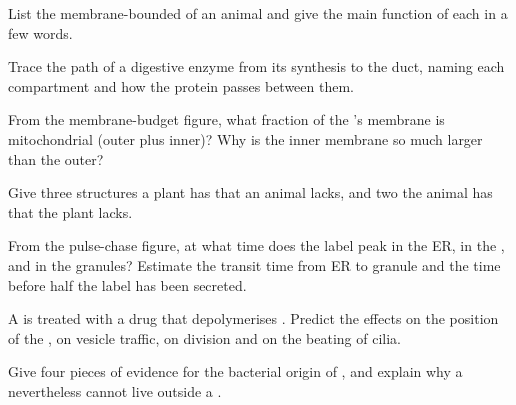 \begin{exercise}[$\star$]\label{exo:b1:eukaryotic-cell:1}
List the membrane-bounded  of an animal  and give the
main function of each in a few words.
\end{exercise}

\begin{exercise}[$\star$]\label{exo:b1:eukaryotic-cell:2}
Trace the path of a digestive enzyme from its synthesis to the duct,
naming each compartment and how the protein passes between them.
\end{exercise}

\begin{exercise}[$\star$]\label{exo:b1:eukaryotic-cell:3}
From the membrane-budget figure, what fraction of the 's membrane
is mitochondrial (outer plus inner)? Why is the inner membrane so much
larger than the outer?
\end{exercise}

\begin{exercise}[$\star$]\label{exo:b1:eukaryotic-cell:4}
Give three structures a plant  has that an animal  lacks, and
two the animal  has that the plant  lacks.
\end{exercise}

\begin{exercise}[$\star\star$]\label{exo:b1:eukaryotic-cell:5}
From the pulse-chase figure, at what time does the label peak in the
ER, in the , and in the granules? Estimate the transit time from
ER to granule and the time before half the label has been secreted.
\end{exercise}

\begin{exercise}[$\star\star$]\label{exo:b1:eukaryotic-cell:6}
A  is treated with a drug that depolymerises .
Predict the effects on the position of the , on vesicle traffic,
on  division and on the beating of cilia.
\end{exercise}

\begin{exercise}[$\star\star$]\label{exo:b1:eukaryotic-cell:7}
Give four pieces of evidence for the bacterial origin of ,
and explain why a  nevertheless cannot live outside a
.
\end{exercise}

